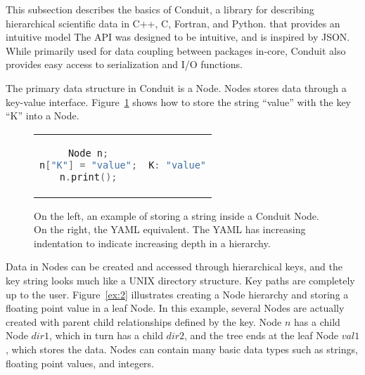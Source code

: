 This subsection describes the basics of Conduit, a library for describing
hierarchical scientific data in C++, C, Fortran, and Python.
%
that provides an intuitive model
The API was designed to be intuitive, and is inspired by JSON.
%
While primarily used for data coupling between packages in-core,
Conduit also provides easy access to serialization and I/O functions.
%
%

The primary data structure in Conduit is a Node.
%
Nodes stores data through a key-value interface.
%
Figure~\ref{ex:1} shows how to store the string ``value'' with the key ``K'' into a Node.

\begin{figure}
\begin{tabular}{cc}
  \begin{minipage}{.5\textwidth}
  \centering
    \begin{lstlisting}[language=C++]
Node n;
n["K"] = "value";
n.print();
    \end{lstlisting}
  \end{minipage}
  &
  \begin{minipage}{.5\textwidth}
  \centering
  \begin{lstlisting}[language=C++]
K: "value"
  \end{lstlisting}
  \end{minipage}
\end{tabular}
\caption{\label{ex:1}On the left, an example of storing a string inside a Conduit Node. On the right, the YAML equivalent.  The YAML has increasing indentation to indicate increasing depth in a hierarchy.}
\end{figure}

Data in Nodes can be created and accessed through hierarchical keys,
and the key string looks much like a UNIX directory structure.
%
Key paths are completely up to the user.
%
Figure~\ref{ex:2} illustrates creating a Node hierarchy
and storing a floating point value in a leaf Node.
%
In this example, several Nodes are actually created with parent child
relationships defined by the key.
%
Node $n$ has a child Node $dir1$, which in turn has a child $dir2$,
and the tree ends at the leaf Node $val1$, which stores the data.
%
Nodes can contain many basic data types such as strings,
floating point values, and integers.

